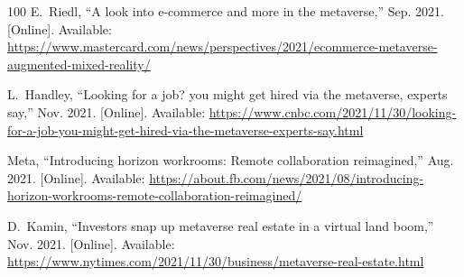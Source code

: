 \documentclass[journal]{IEEEtran}
\begin{document}
\begin{thebibliography}{100}
	\BIBentryALTinterwordspacing
	E.~Riedl, ``A look into e-commerce and more in the metaverse,'' Sep. 2021.
	[Online]. Available:
	\url{https://www.mastercard.com/news/perspectives/2021/ecommerce-metaverse-augmented-mixed-reality/}
	\BIBentrySTDinterwordspacing
	
	\BIBentryALTinterwordspacing
	L.~Handley, ``Looking for a job? you might get hired via the metaverse, experts
	say,'' Nov. 2021. [Online]. Available:
	\url{https://www.cnbc.com/2021/11/30/looking-for-a-job-you-might-get-hired-via-the-metaverse-experts-say.html}
	\BIBentrySTDinterwordspacing
	
	\BIBentryALTinterwordspacing
	Meta, ``Introducing horizon workrooms: Remote collaboration reimagined,'' Aug.
	2021. [Online]. Available:
	\url{https://about.fb.com/news/2021/08/introducing-horizon-workrooms-remote-collaboration-reimagined/}
	\BIBentrySTDinterwordspacing
	
	\BIBentryALTinterwordspacing
	D.~Kamin, ``Investors snap up metaverse real estate in a virtual land boom,''
	Nov. 2021. [Online]. Available:
	\url{https://www.nytimes.com/2021/11/30/business/metaverse-real-estate.html}
	\BIBentrySTDinterwordspacing
	
\end{thebibliography}
\end{document}
